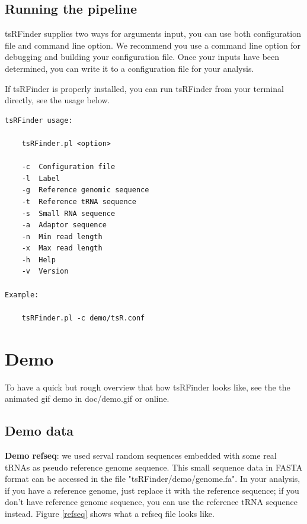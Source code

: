 \documentclass[11pt, a4paper]{article}
\begin{document}
\subsection{Running the pipeline}

tsRFinder supplies two ways for arguments input, you can use both configuration file and command line option. We recommend you use a command line option for debugging and building your configuration file. Once your inputs have been determined, you can write it to a configuration file for your analysis.

If tsRFinder is properly installed, you can run tsRFinder from your terminal directly, see the usage below.

{\small \begin{verbatim}
tsRFinder usage:

    tsRFinder.pl <option>

    -c  Configuration file
    -l  Label
    -g  Reference genomic sequence
    -t  Reference tRNA sequence
    -s  Small RNA sequence
    -a  Adaptor sequence
    -n  Min read length
    -x  Max read length
    -h  Help
    -v  Version

Example:

    tsRFinder.pl -c demo/tsR.conf
\end{verbatim}}

\section{Demo}

To have a quick but rough overview that how tsRFinder looks like, see the the animated gif demo in doc/demo.gif or online.

\subsection{Demo data}

\textbf{Demo refseq}: we used serval random sequences embedded with some real tRNAs as pseudo reference genome sequence. This small sequence data in FASTA format can be accessed in the file "tsRFinder/demo/genome.fa". In your analysis, if you have a reference genome, just replace it with the reference sequence; if you don't have reference genome sequence, you can use the reference tRNA sequence instead. Figure \ref{refseq} shows what a refseq file looks like.
\end{document}
